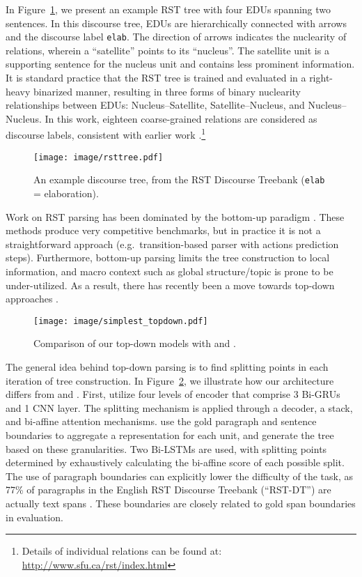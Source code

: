 \documentclass[11pt,a4paper]{article}
\newcommand{\rstrel}[1]{\texttt{#1}\xspace}
\newcommand{\figref}[2][]{Figure#1~\ref{fig:#2}}
\begin{document}
In \figref{rsttree}, we present an example RST tree with
four EDUs spanning two sentences. In this discourse tree, EDUs are
hierarchically connected with arrows and the discourse label \texttt{elab}.
The direction of arrows indicates the nuclearity of relations, wherein a
``satellite'' points to its ``nucleus''.  The {satellite} unit is a
supporting sentence for the {nucleus} unit and contains less prominent
information. It is standard practice that the RST tree is trained and
evaluated in a right-heavy binarized manner, resulting in three forms of
binary nuclearity relationships between EDUs: {Nucleus--Satellite}, {Satellite--Nucleus},
and  {Nucleus--Nucleus}. In this work, eighteen coarse-grained relations are
considered as discourse labels, consistent with earlier work \cite{yu-etal-2018-transition}.\footnote{Details of individual relations can be found at: \url{http://www.sfu.ca/rst/index.html}}


\begin{figure}
	\centering
	\texttt{[image: image/rsttree.pdf]}
	\caption{An example discourse tree, from the RST Discourse Treebank (\rstrel{elab} = elaboration).}
	\label{fig:rsttree}
\end{figure}

Work on RST parsing has been dominated by the bottom-up paradigm
\cite{hernault2010hilda,feng-hirst-2014-linear,ji-eisenstein-2014-representation,braud-etal-2017-cross-lingual,morey-etal-2017-much,yu2018transition}.
These methods produce very competitive benchmarks, but in practice it is 
not a straightforward	approach (e.g.\ transition-based parser with 
actions prediction steps). Furthermore, bottom-up parsing limits the 
tree construction to local information, and macro context such as global 
structure/topic is prone to be under-utilized. As a result, there
has recently been a move towards top-down approaches \cite{kobayashi2020top,zhang-etal-2020-top}.
\begin{figure}
	\centering
	\texttt{[image: image/simplest\_topdown.pdf]}
	\caption{Comparison of our top-down models with
          \citet{zhang-etal-2020-top} and \citet{kobayashi2020top}.}
	\label{fig:compare}
\end{figure}

The general idea behind top-down parsing is to find splitting points in each iteration of tree construction.
In \figref{compare}, we illustrate how our
architecture differs from \citet{zhang-etal-2020-top} and \citet{kobayashi2020top}. First, \citet{zhang-etal-2020-top} utilize four levels of encoder that comprise 3 Bi-GRUs and 1 CNN layer. The splitting mechanism is applied through a decoder, a stack, and bi-affine attention mechanisms.
\citet{kobayashi2020top} use the gold paragraph and sentence boundaries
to aggregate a representation for each unit, and generate the tree based
on these granularities. Two Bi-LSTMs are used, with splitting points
determined by exhaustively calculating the bi-affine score of each
possible split. The use of paragraph boundaries can explicitly lower the
difficulty of the task, as 77\% of paragraphs in the English RST Discourse Treebank (``RST-DT'') are actually text spans \cite{carlson2001building}. These boundaries are closely related to gold span boundaries in evaluation.
\end{document}
